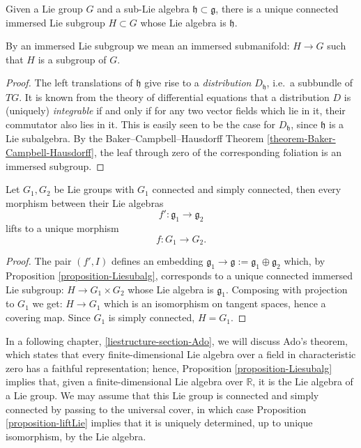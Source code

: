 \begin{proposition}
\label{proposition-Liesubalg}
 Given a Lie group $G$ and a sub-Lie algebra $\mathfrak h\subset \mathfrak g$, there is a unique connected immersed Lie subgroup $H\subset G$ whose Lie algebra is $\mathfrak h$.
\end{proposition}

By an immersed Lie subgroup we mean an immersed submanifold: $H\to G$ such that $H$ is a subgroup of $G$.


\begin{proof}
 The left translations of $\mathfrak h$ give rise to a \emph{distribution} $D_{\mathfrak h}$, i.e.\ a subbundle of $TG$. It is known from the theory of differential equations that a distribution $D$ is (uniquely) \emph{integrable} if and only if for any two vector fields which lie in it, their commutator also lies in it. This is easily seen to be the case for $D_{\mathfrak h}$, since $\mathfrak h$ is a Lie subalgebra. By the Baker--Campbell--Hausdorff Theorem \ref{theorem-Baker-Campbell-Hausdorff}, the leaf through zero of the corresponding foliation is an immersed subgroup.
\end{proof}


\begin{proposition}
\label{proposition-liftLie}
 Let $G_1, G_2$ be Lie groups with $G_1$ connected and simply connected, then every morphism between their Lie algebras 
 $$f':\mathfrak g_1\to\mathfrak g_2$$ 
 lifts to a unique morphism 
 $$f: G_1\to G_2.$$
\end{proposition}


\begin{proof}
The pair $(f', I)$ defines an embedding $\mathfrak g_1\to \mathfrak g:=\mathfrak g_1\oplus \mathfrak g_2$ which, by Proposition \ref{proposition-Liesubalg}, corresponds to a unique connected immersed Lie subgroup: $H\to G_1\times G_2$ whose Lie algebra is $\mathfrak g_1$. Composing with projection to $G_1$ we get: $H\to G_1$ which is an isomorphism on tangent spaces, hence a covering map. Since $G_1$ is simply connected, $H=G_1$. 
\end{proof}


\begin{remark}
 \label{remark-existsgroup}
In a following chapter, \ref{liestructure-section-Ado}, we will discuss Ado's theorem, which states that every finite-dimensional Lie algebra over a field in characteristic zero has a faithful representation; hence, Proposition \ref{proposition-Liesubalg} implies that, given a finite-dimensional Lie algebra over $\mathbb R$, it is the Lie algebra of a Lie group. We may assume that this Lie group is connected and simply connected by passing to the universal cover, in which case Proposition \ref{proposition-liftLie} implies that it is uniquely determined, up to unique isomorphism, by the Lie algebra.
\end{remark}






